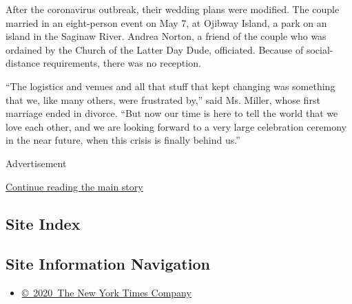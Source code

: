 After the coronavirus outbreak, their wedding plans were modified. The
couple married in an eight-person event on May 7, at Ojibway Island, a
park on an island in the Saginaw River. Andrea Norton, a friend of the
couple who was ordained by the Church of the Latter Day Dude,
officiated. Because of social-distance requirements, there was no
reception.

``The logistics and venues and all that stuff that kept changing was
something that we, like many others, were frustrated by,'' said Ms.
Miller, whose first marriage ended in divorce. ``But now our time is
here to tell the world that we love each other, and we are looking
forward to a very large celebration ceremony in the near future, when
this crisis is finally behind us.''

Advertisement

\protect\hyperlink{after-bottom}{Continue reading the main story}

\hypertarget{site-index}{%
\subsection{Site Index}\label{site-index}}

\hypertarget{site-information-navigation}{%
\subsection{Site Information
Navigation}\label{site-information-navigation}}

\begin{itemize}
\tightlist
\item
  \href{https://help.nytimes3xbfgragh.onion/hc/en-us/articles/115014792127-Copyright-notice}{©~2020~The
  New York Times Company}
\end{itemize}

